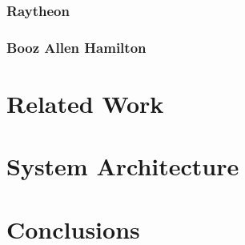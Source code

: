 \documentclass[12pt,letterpaper]{article}
\begin{document}
\subsubsection{Raytheon}

\subsubsection{Booz Allen Hamilton}



\section{Related Work}

\section{System Architecture}

\section{Conclusions}



\end{document}
